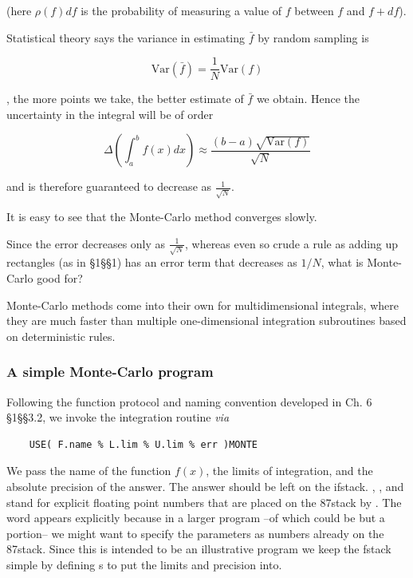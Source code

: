 (here $\rho(f)df$ is the probability of measuring a value of $f$ between $f$ and $f + df$).

Statistical theory says the variance in estimating $\bar{f}$ by random sampling is

\begin{equation}
\text{Var}(\bar{f}) = \frac{1}{N} \text{Var}(f)
\end{equation}

\ie, the more points we take, the better estimate of $\bar{f}$ we obtain. Hence the uncertainty in the integral will be of order

\begin{equation}
\Delta \left(\int_{a}^{b}f(x)dx\right) \approx \frac{(b-a)\sqrt{\text{Var}(f)}}{\sqrt{N}}
\end{equation}

and is therefore guaranteed to decrease as $\frac{1}{\sqrt{N}}$.

It is easy to see that the Monte-Carlo method converges slowly.

Since the error decreases only as $\frac{1}{\sqrt{N}}$, whereas even so crude a rule as adding up rectangles (as in \S1\S\S1) has an error term that decreases as $1/N$, what is Monte-Carlo good for?

Monte-Carlo methods come into their own for multidimensional integrals, where they are much faster than multiple one-dimensional integration subroutines based on deterministic rules.

\subsubsection{A simple Monte-Carlo program}\label{chap:08_01_03_02}
Following the function protocol and naming convention developed in Ch. 6 \S1\S\S3.2, we invoke the integration routine \textit{via}

\begin{lstlisting}
    USE( F.name % L.lim % U.lim % err )MONTE
\end{lstlisting}

We pass  the name  of the function $f(x)$, the limits of integration, and the absolute precision of the answer. The answer should be left on the ifstack. , , and  stand for explicit ﬂoating point numbers that are placed on the 87stack by \bc{\%}. The word \bc{\%} appears explicitly because in a larger program --of which  could be but a portion-- we might want to specify the parameters as numbers already on the 87stack. Since this is intended to be an illustrative program we keep the fstack simple by defining s to put the limits and precision into.


